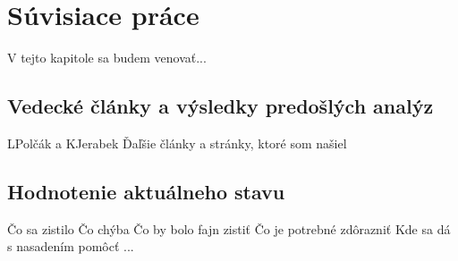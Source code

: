 \chapter{Súvisiace práce}
\label{related-work}

V tejto kapitole sa budem venovať...


\section{Vedecké články a výsledky predošlých analýz}

LPolčák a KJerabek \cite{nel-http-archive}\cite{dp-security-issues-nel}
Ďaľšie články a stránky, ktoré som našiel

\section{Hodnotenie aktuálneho stavu}

Čo sa zistilo
Čo chýba
Čo by bolo fajn zistiť
Čo je potrebné zdôrazniť
Kde sa dá s nasadením pomôcť
...
